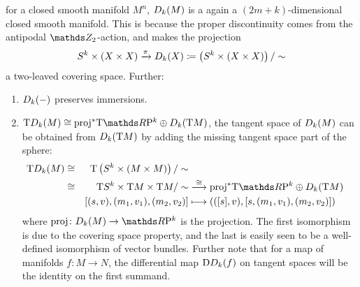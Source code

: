 \begin{Rem}
\begin{enumerate}
    for a closed smooth manifold $M^n$, $D_{k}({M})$ is a
    again a $(2m+k)$-dimensional closed smooth manifold.
    This is because the proper discontinuity comes from the antipodal
    $\Zmod2$-action, and makes the projection
    \begin{gather*}
      S^{k}\times(X\times X)
      \xrightarrow{\pi}
      D_{k}({X})
      \coloneqq
      \left( S^{k}\times(X\times X) \right)/\sim
    \end{gather*}
    a two-leaved covering space.
    Further:
    \begin{enumerate}
    \item\label{item:twistedprodpreservesimmersions}
      $D_{k}({-})$ preserves immersions.
    \item\label{item:twistedprod:tangentspace}
      $\T\Twistedprod{k}{M}
      \cong \pb\proj\T{\RP k} \oplus \Twistedprod{k}{\T M}$,
      \idest the tangent space of $D_{k}({M})$ can be obtained
      from $D_{k}({\mathrm{T}M})$ by adding the missing tangent space
      part of the sphere:
      \begin{alignat*}{4}
        \T{\Twistedprod{k}{M}}
        &\cong& \T{\left(\Twistedprodcovspace{k}{M}\right)}/\sim \\
        &\cong& \T \Sphere k\times \T M\times\T M/\sim
        &\overset{\cong}{\longto}
        \pb\proj \T{\RP k} \oplus \Twistedprod{k}{\T M}
        \\
        &&[(s,v), (m_1,v_1), (m_2,v_2)]
        &\longmapsto
        \left( ([s], v), [s, (m_1,v_1), (m_2, v_2)] \right)
      \end{alignat*}
      where $\proj\colon\Twistedprod{k}{M}\to\RP k$ is the projection.
      The first isomorphism is due to the covering space property, and
      the last is easily seen to be a well-defined isomorphism of
      vector bundles.
      Further note that for a map of manifolds $f\colon M\to N$,
      the differential map $\mathrm{D}D_{k}({f})$ on tangent spaces
      will be the identity on the first summand.
    \end{enumerate}
  \end{enumerate}
\end{Rem}

